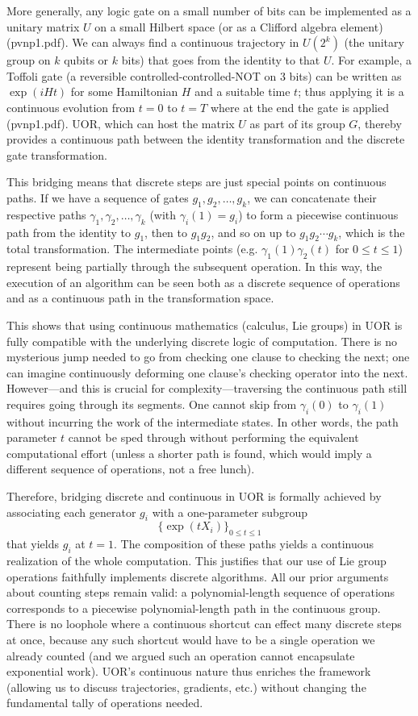 \documentclass{article}
\begin{document}
More generally, any logic gate on a small number of bits can be implemented as a unitary matrix $U$ on a small Hilbert space (or as a Clifford algebra element) (pvnp1.pdf). We can always find a continuous trajectory in $U(2^k)$ (the unitary group on $k$ qubits or $k$ bits) that goes from the identity to that $U$. For example, a Toffoli gate (a reversible controlled-controlled-NOT on 3 bits) can be written as $\exp(iHt)$ for some Hamiltonian $H$ and a suitable time $t$; thus applying it is a continuous evolution from $t=0$ to $t=T$ where at the end the gate is applied (pvnp1.pdf). UOR, which can host the matrix $U$ as part of its group $G$, thereby provides a continuous path between the identity transformation and the discrete gate transformation.

This bridging means that discrete steps are just special points on continuous paths. If we have a sequence of gates $g_1, g_2, \ldots, g_k$, we can concatenate their respective paths $\gamma_1, \gamma_2, \ldots, \gamma_k$ (with $\gamma_i(1)=g_i$) to form a piecewise continuous path from the identity to $g_1$, then to $g_1g_2$, and so on up to $g_1g_2\cdots g_k$, which is the total transformation. The intermediate points (e.g. $\gamma_1(1)\gamma_2(t)$ for $0\le t \le 1$) represent being partially through the subsequent operation. In this way, the execution of an algorithm can be seen both as a discrete sequence of operations and as a continuous path in the transformation space.

This shows that using continuous mathematics (calculus, Lie groups) in UOR is fully compatible with the underlying discrete logic of computation. There is no mysterious jump needed to go from checking one clause to checking the next; one can imagine continuously deforming one clause’s checking operator into the next. However—and this is crucial for complexity—traversing the continuous path still requires going through its segments. One cannot skip from $\gamma_i(0)$ to $\gamma_i(1)$ without incurring the work of the intermediate states. In other words, the path parameter $t$ cannot be sped through without performing the equivalent computational effort (unless a shorter path is found, which would imply a different sequence of operations, not a free lunch).

Therefore, bridging discrete and continuous in UOR is formally achieved by associating each generator $g_i$ with a one-parameter subgroup 
\[
\{\exp(tX_i)\}_{0\le t\le 1}
\]
that yields $g_i$ at $t=1$. The composition of these paths yields a continuous realization of the whole computation. This justifies that our use of Lie group operations faithfully implements discrete algorithms. All our prior arguments about counting steps remain valid: a polynomial-length sequence of operations corresponds to a piecewise polynomial-length path in the continuous group. There is no loophole where a continuous shortcut can effect many discrete steps at once, because any such shortcut would have to be a single operation we already counted (and we argued such an operation cannot encapsulate exponential work). UOR’s continuous nature thus enriches the framework (allowing us to discuss trajectories, gradients, etc.) without changing the fundamental tally of operations needed.
\end{document}
